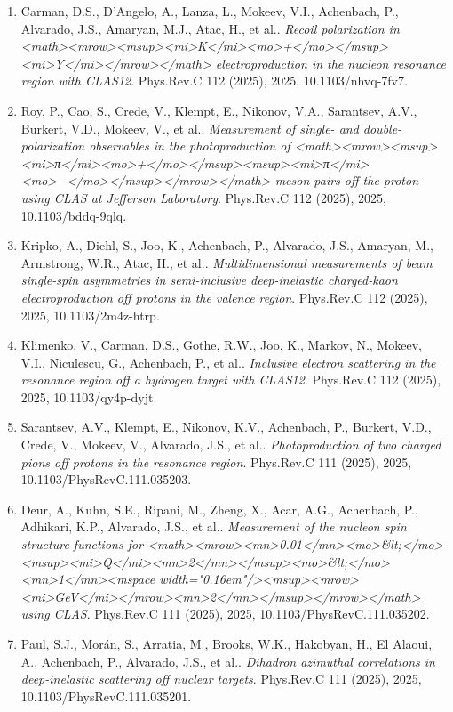 \begin{enumerate}
\item Carman, D.S., D'Angelo, A., Lanza, L., Mokeev, V.I., Achenbach, P., Alvarado, J.S., Amaryan, M.J., Atac, H., et al.. \textit{Recoil polarization in <math><mrow><msup><mi>K</mi><mo>+</mo></msup><mi>Y</mi></mrow></math> electroproduction in the nucleon resonance region with CLAS12}. Phys.Rev.C 112 (2025), 2025, 10.1103/nhvq-7fv7.
\item Roy, P., Cao, S., Crede, V., Klempt, E., Nikonov, V.A., Sarantsev, A.V., Burkert, V.D., Mokeev, V., et al.. \textit{Measurement of single- and double-polarization observables in the photoproduction of <math><mrow><msup><mi>π</mi><mo>+</mo></msup><msup><mi>π</mi><mo>−</mo></msup></mrow></math> meson pairs off the proton using CLAS at Jefferson Laboratory}. Phys.Rev.C 112 (2025), 2025, 10.1103/bddq-9qlq.
\item Kripko, A., Diehl, S., Joo, K., Achenbach, P., Alvarado, J.S., Amaryan, M., Armstrong, W.R., Atac, H., et al.. \textit{Multidimensional measurements of beam single-spin asymmetries in semi-inclusive deep-inelastic charged-kaon electroproduction off protons in the valence region}. Phys.Rev.C 112 (2025), 2025, 10.1103/2m4z-htrp.
\item Klimenko, V., Carman, D.S., Gothe, R.W., Joo, K., Markov, N., Mokeev, V.I., Niculescu, G., Achenbach, P., et al.. \textit{Inclusive electron scattering in the resonance region off a hydrogen target with CLAS12}. Phys.Rev.C 112 (2025), 2025, 10.1103/qy4p-dyjt.
\item Sarantsev, A.V., Klempt, E., Nikonov, K.V., Achenbach, P., Burkert, V.D., Crede, V., Mokeev, V., Alvarado, J.S., et al.. \textit{Photoproduction of two charged pions off protons in the resonance region}. Phys.Rev.C 111 (2025), 2025, 10.1103/PhysRevC.111.035203.
\item Deur, A., Kuhn, S.E., Ripani, M., Zheng, X., Acar, A.G., Achenbach, P., Adhikari, K.P., Alvarado, J.S., et al.. \textit{Measurement of the nucleon spin structure functions for <math><mrow><mn>0.01</mn><mo>\&lt;</mo><msup><mi>Q</mi><mn>2</mn></msup><mo>\&lt;</mo><mn>1</mn><mspace width="0.16em"/><msup><mrow><mi>GeV</mi></mrow><mn>2</mn></msup></mrow></math> using CLAS}. Phys.Rev.C 111 (2025), 2025, 10.1103/PhysRevC.111.035202.
\item Paul, S.J., Morán, S., Arratia, M., Brooks, W.K., Hakobyan, H., El Alaoui, A., Achenbach, P., Alvarado, J.S., et al.. \textit{Dihadron azimuthal correlations in deep-inelastic scattering off nuclear targets}. Phys.Rev.C 111 (2025), 2025, 10.1103/PhysRevC.111.035201.

\end{enumerate}
